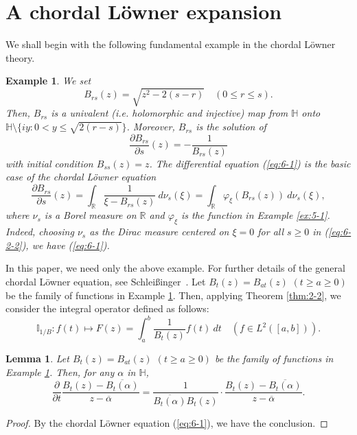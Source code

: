 \documentclass[12pt]{article}
\newtheorem{lem}[thm]{Lemma}
\newtheorem{ex}[thm]{Example}
\numberwithin{equation}{section}
\newcommand{\R}{{\mathbb R}}
\newcommand{\bH}{{\mathbb H}}
\newcommand{\bI}{{\mathbb I}}
\newcommand{\p}{\partial}
\begin{document}
\section{A chordal L\"{o}wner expansion}\label{sec:2-1-6}


We shall begin with the following fundamental example in the chordal L\"{o}wner theory. 
\begin{ex}\label{ex:6-1} \rm
We set 
\[
B_{rs}(z)=\sqrt{z^2-2(s-r)}\quad (0\leq r \leq s).
\] 
Then, $B_{rs}$ is a univalent (i.e. holomorphic and injective) map from $\bH$ onto $\bH \setminus \{iy: 0<y \leq \sqrt{2(r-s)}\}$. 
Moreover,  
$B_{rs}$ is the solution of  
\begin{equation}\label{eq:6-1}
\frac{\p B_{rs}}{\p s}(z)=-\frac{1}{B_{rs}(z)}
\end{equation}
with initial condition $B_{ss}(z)=z$. 
The differential equation (\ref{eq:6-1}) is the basic case of the chordal L\"{o}wner equation
\begin{equation}\label{eq:6-2-2}
\frac{\p B_{rs}}{\p s}(z)=\int_{\R}\frac{1}{\xi-B_{rs}(z)}\ d\nu_s(\xi)=\int_{\R}\varphi_{\xi}(B_{rs}(z))\ d\nu_s(\xi),
\end{equation}
where $\nu_s$ is a Borel measure on $\R$ and $\varphi_{\xi}$ is the function in Example \ref{ex:5-1}.
Indeed, choosing $\nu_s$ as the Dirac measure centered on $\xi=0$ for all $s\geq 0$ in (\ref{eq:6-2-2}), 
we have (\ref{eq:6-1}). 
\end{ex}
In this paper, we need only the above example.  
For further details of the general chordal L\"{o}wner equation, see Schlei{\ss}inger~\cite{Sch}. 
Let $B_t(z)=B_{at}(z)$ $(t\geq a\geq 0)$ be the family of functions in Example \ref{ex:6-1}.
Then, applying Theorem \ref{thm:2-2}, we consider the integral operator defined as follows: 
\[
\bI_{1/B}: 
f(t) \mapsto F(z)=\int_a^b \frac{1}{B_t(z)}f(t)\ dt \quad (f\in L^2([a,b])).
\]

\begin{lem}\label{lem:6-2}
Let $B_t(z)=B_{at}(z)$ $(t\geq a\geq 0)$ be the family of functions in Example \ref{ex:6-1}.
Then, for any $\alpha$ in $\bH$, 
\[
\frac{\p}{\p t}
\frac{B_t(z)-\overline{B_t(\alpha)}}{z-\overline{\alpha}}
=\frac{1}{\overline{B_t(\alpha)}B_t(z)}\cdot \frac{B_t(z)-\overline{B_t(\alpha)}}{z-\overline{\alpha}}.
\]
\end{lem}

\begin{proof}
By the chordal L\"{o}wner equation (\ref{eq:6-1}), we have the conclusion. 
\end{proof}
\end{document}

